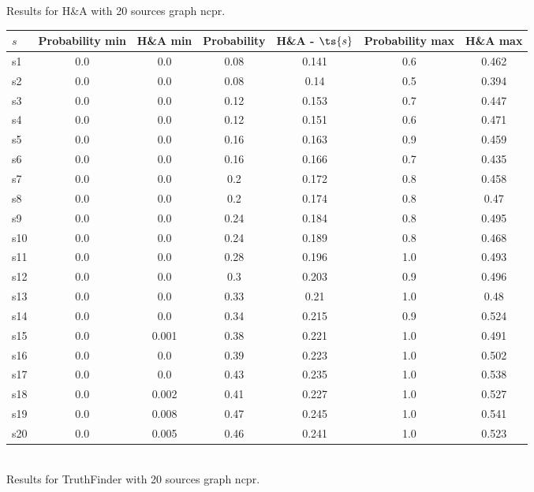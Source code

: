 \documentclass{article}
\begin{document}
\noindent Results for H\&A with 20 sources graph ncpr.

\noindent\begin{tabular}{|l|c|c|c|c|c|c|}
\hline
$s$& Probability min & H\&A min & Probability & H\&A - $\ts{s}$ & Probability max & H\&A max\\
\hline
s1 &0.0 & 0.0 & 0.08 & 0.141 & 0.6 & 0.462\\
\hline
s2 &0.0 & 0.0 & 0.08 & 0.14 & 0.5 & 0.394\\
\hline
s3 &0.0 & 0.0 & 0.12 & 0.153 & 0.7 & 0.447\\
\hline
s4 &0.0 & 0.0 & 0.12 & 0.151 & 0.6 & 0.471\\
\hline
s5 &0.0 & 0.0 & 0.16 & 0.163 & 0.9 & 0.459\\
\hline
s6 &0.0 & 0.0 & 0.16 & 0.166 & 0.7 & 0.435\\
\hline
s7 &0.0 & 0.0 & 0.2 & 0.172 & 0.8 & 0.458\\
\hline
s8 &0.0 & 0.0 & 0.2 & 0.174 & 0.8 & 0.47\\
\hline
s9 &0.0 & 0.0 & 0.24 & 0.184 & 0.8 & 0.495\\
\hline
s10 &0.0 & 0.0 & 0.24 & 0.189 & 0.8 & 0.468\\
\hline
s11 &0.0 & 0.0 & 0.28 & 0.196 & 1.0 & 0.493\\
\hline
s12 &0.0 & 0.0 & 0.3 & 0.203 & 0.9 & 0.496\\
\hline
s13 &0.0 & 0.0 & 0.33 & 0.21 & 1.0 & 0.48\\
\hline
s14 &0.0 & 0.0 & 0.34 & 0.215 & 0.9 & 0.524\\
\hline
s15 &0.0 & 0.001 & 0.38 & 0.221 & 1.0 & 0.491\\
\hline
s16 &0.0 & 0.0 & 0.39 & 0.223 & 1.0 & 0.502\\
\hline
s17 &0.0 & 0.0 & 0.43 & 0.235 & 1.0 & 0.538\\
\hline
s18 &0.0 & 0.002 & 0.41 & 0.227 & 1.0 & 0.527\\
\hline
s19 &0.0 & 0.008 & 0.47 & 0.245 & 1.0 & 0.541\\
\hline
s20 &0.0 & 0.005 & 0.46 & 0.241 & 1.0 & 0.523\\
\hline
\end{tabular}\\

\noindent Results for TruthFinder with 20 sources graph ncpr.
\end{document}
